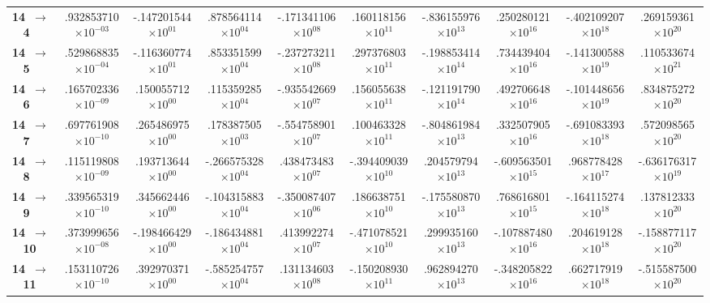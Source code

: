 \documentclass[reviewcopy]{elsarticle}
\begin{document}
\begin{landscape}
\begin{longtable}{lccccccccc}
{\bf 14~$\to$~ 4}   &   .932853710$\times10^{-03}$ & -.147201544$\times10^{ 01}$ &  .878564114$\times10^{ 04}$ & -.171341106$\times10^{ 08}$ &  .160118156$\times10^{ 11}$ & -.836155976$\times10^{ 13}$ &  .250280121$\times10^{ 16}$ & -.402109207$\times10^{ 18}$ &  .269159361$\times10^{ 20}$ \\
{\bf 14~$\to$~ 5}   &   .529868835$\times10^{-04}$ & -.116360774$\times10^{ 01}$ &  .853351599$\times10^{ 04}$ & -.237273211$\times10^{ 08}$ &  .297376803$\times10^{ 11}$ & -.198853414$\times10^{ 14}$ &  .734439404$\times10^{ 16}$ & -.141300588$\times10^{ 19}$ &  .110533674$\times10^{ 21}$ \\
{\bf 14~$\to$~ 6}   &   .165702336$\times10^{-09}$ &  .150055712$\times10^{ 00}$ &  .115359285$\times10^{ 04}$ & -.935542669$\times10^{ 07}$ &  .156055638$\times10^{ 11}$ & -.121191790$\times10^{ 14}$ &  .492706648$\times10^{ 16}$ & -.101448656$\times10^{ 19}$ &  .834875272$\times10^{ 20}$ \\
{\bf 14~$\to$~ 7}   &   .697761908$\times10^{-10}$ &  .265486975$\times10^{ 00}$ &  .178387505$\times10^{ 03}$ & -.554758901$\times10^{ 07}$ &  .100463328$\times10^{ 11}$ & -.804861984$\times10^{ 13}$ &  .332507905$\times10^{ 16}$ & -.691083393$\times10^{ 18}$ &  .572098565$\times10^{ 20}$ \\
{\bf 14~$\to$~ 8}   &   .115119808$\times10^{-09}$ &  .193713644$\times10^{ 00}$ & -.266575328$\times10^{ 04}$ &  .438473483$\times10^{ 07}$ & -.394409039$\times10^{ 10}$ &  .204579794$\times10^{ 13}$ & -.609563501$\times10^{ 15}$ &  .968778428$\times10^{ 17}$ & -.636176317$\times10^{ 19}$ \\
{\bf 14~$\to$~ 9}   &   .339565319$\times10^{-10}$ &  .345662446$\times10^{ 00}$ & -.104315883$\times10^{ 04}$ & -.350087407$\times10^{ 06}$ &  .186638751$\times10^{ 10}$ & -.175580870$\times10^{ 13}$ &  .768616801$\times10^{ 15}$ & -.164115274$\times10^{ 18}$ &  .137812333$\times10^{ 20}$ \\
{\bf 14~$\to$~ 10}  &   .373999656$\times10^{-08}$ & -.198466429$\times10^{ 00}$ & -.186434881$\times10^{ 04}$ &  .413992274$\times10^{ 07}$ & -.471078521$\times10^{ 10}$ &  .299935160$\times10^{ 13}$ & -.107887480$\times10^{ 16}$ &  .204619128$\times10^{ 18}$ & -.158877117$\times10^{ 20}$ \\
{\bf 14~$\to$~ 11}  &   .153110726$\times10^{-10}$ &  .392970371$\times10^{ 00}$ & -.585254757$\times10^{ 04}$ &  .131134603$\times10^{ 08}$ & -.150208930$\times10^{ 11}$ &  .962894270$\times10^{ 13}$ & -.348205822$\times10^{ 16}$ &  .662717919$\times10^{ 18}$ & -.515587500$\times10^{ 20}$ \\

\end{longtable}
\end{landscape}
\end{document}
